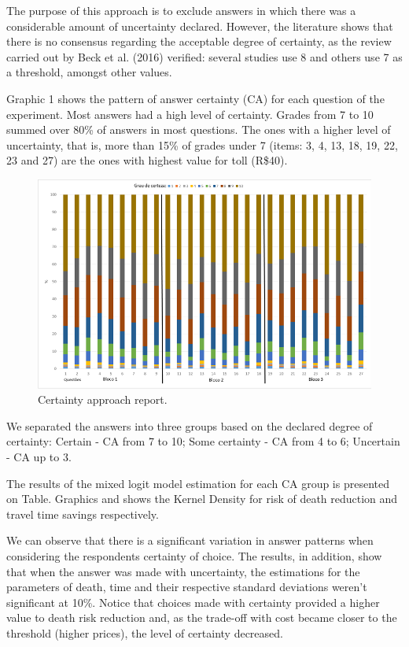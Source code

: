 \documentclass[]{elsarticle} %
\makeatletter
\def\maxwidth{\ifdim\Gin@nat@width>\linewidth\linewidth
\else\Gin@nat@width\fi}
\let\Oldincludegraphics\includegraphics
\renewcommand{\includegraphics}[1]{\Oldincludegraphics[width=\maxwidth]{#1}}
\makeatother
\begin{document}
The purpose of this approach is to exclude answers in which there was a
considerable amount of uncertainty declared. However, the literature
shows that there is no consensus regarding the acceptable degree of
certainty, as the review carried out by Beck et al. (2016) verified:
several studies use 8 and others use 7 as a threshold, amongst other
values.

Graphic 1 shows the pattern of answer certainty (CA) for each question
of the experiment. Most answers had a high level of certainty. Grades
from 7 to 10 summed over 80\% of answers in most questions. The ones
with a higher level of uncertainty, that is, more than 15\% of grades
under 7 (items: 3, 4, 13, 18, 19, 22, 23 and 27) are the ones with
highest value for toll (R\$40).

\begin{figure}
\centering
\includegraphics{CA.png}
\caption{Certainty approach report.}
\end{figure}

We separated the answers into three groups based on the declared degree
of certainty: Certain - CA from 7 to 10; Some certainty - CA from 4 to
6; Uncertain - CA up to 3.

The results of the mixed logit model estimation for each CA group is
presented on Table. Graphics and shows the Kernel Density for risk of
death reduction and travel time savings respectively.

We can observe that there is a significant variation in answer patterns
when considering the respondents certainty of choice. The results, in
addition, show that when the answer was made with uncertainty, the
estimations for the parameters of death, time and their respective
standard deviations weren't significant at 10\%. Notice that choices
made with certainty provided a higher value to death risk reduction and,
as the trade-off with cost became closer to the threshold (higher
prices), the level of certainty decreased.
\end{document}
